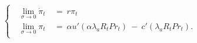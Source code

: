 \begin{equation}
\begin{cases}
        \begin{split}
        \ \lim_{\sigma \to 0} \dot{\pi}_{t} \
        & = \ r\pi_{t} \\
        \ \lim_{\sigma \to 0} \pi_{t} \
        & = \ \alpha u'(\alpha \lambda_{a} R_{t} Pr_{t}) \ - \ c'(\lambda_{a} R_{t} Pr_{t}).
        \end{split}
    \end{cases}
\label{Equation:Social-Planners-Problem_Reverting-to-the-Hotelling-Model}
\end{equation}